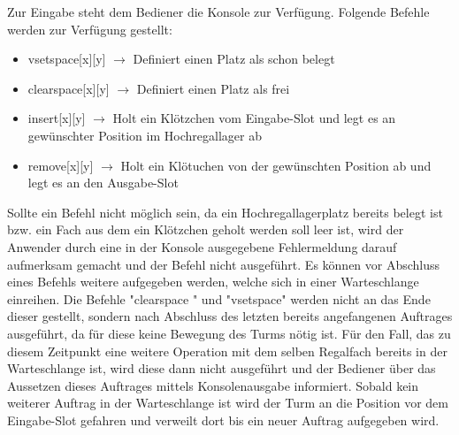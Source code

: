 Zur Eingabe steht dem Bediener die Konsole zur Verfügung.
\newline\newline
Folgende Befehle werden zur Verfügung gestellt:
\begin{itemize} 
	\item vsetspace[x][y] $\rightarrow$ Definiert einen Platz als schon belegt
	\item clearspace[x][y] $\rightarrow$ Definiert einen Platz als frei
	\item insert[x][y] $\rightarrow$ Holt ein Klötzchen vom Eingabe-Slot und legt es an gewünschter Position im Hochregallager ab
	\item remove[x][y] $\rightarrow$ Holt ein Klötuchen von der gewünschten Position ab und legt es an den Ausgabe-Slot
\end{itemize}

Sollte ein Befehl nicht möglich sein, da ein Hochregallagerplatz bereits belegt ist bzw. ein Fach aus dem ein Klötzchen geholt werden soll leer ist, wird der Anwender durch eine in der Konsole ausgegebene Fehlermeldung darauf aufmerksam gemacht und der Befehl nicht ausgeführt. Es können vor Abschluss eines Befehls weitere aufgegeben werden, welche sich in einer Warteschlange einreihen. Die Befehle "clearspace " und "vsetspace" werden nicht an das Ende dieser gestellt, sondern nach Abschluss des letzten bereits angefangenen Auftrages ausgeführt, da für diese keine Bewegung des Turms nötig ist. Für den Fall, das zu diesem Zeitpunkt eine weitere Operation mit dem selben Regalfach bereits in der Warteschlange ist, wird diese dann nicht ausgeführt und der Bediener über das Aussetzen dieses Auftrages mittels Konsolenausgabe informiert.
Sobald kein weiterer Auftrag in der Warteschlange ist wird der Turm an die Position vor dem Eingabe-Slot gefahren und verweilt dort bis ein neuer Auftrag aufgegeben wird.

